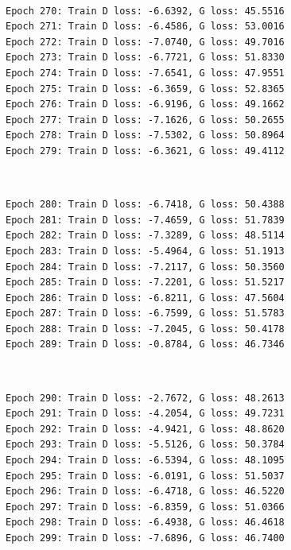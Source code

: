 \documentclass[11pt]{article}
\begin{document}
    \begin{center}
    \end{center}
    { \hspace*{\fill} \\}
    
    \begin{Verbatim}[commandchars=\\\{\}]
Epoch 270: Train D loss: -6.6392, G loss: 45.5516
Epoch 271: Train D loss: -6.4586, G loss: 53.0016
Epoch 272: Train D loss: -7.0740, G loss: 49.7016
Epoch 273: Train D loss: -6.7721, G loss: 51.8330
Epoch 274: Train D loss: -7.6541, G loss: 47.9551
Epoch 275: Train D loss: -6.3659, G loss: 52.8365
Epoch 276: Train D loss: -6.9196, G loss: 49.1662
Epoch 277: Train D loss: -7.1626, G loss: 50.2655
Epoch 278: Train D loss: -7.5302, G loss: 50.8964
Epoch 279: Train D loss: -6.3621, G loss: 49.4112

    \end{Verbatim}

    \begin{center}
    \end{center}
    { \hspace*{\fill} \\}
    
    \begin{Verbatim}[commandchars=\\\{\}]
Epoch 280: Train D loss: -6.7418, G loss: 50.4388
Epoch 281: Train D loss: -7.4659, G loss: 51.7839
Epoch 282: Train D loss: -7.3289, G loss: 48.5114
Epoch 283: Train D loss: -5.4964, G loss: 51.1913
Epoch 284: Train D loss: -7.2117, G loss: 50.3560
Epoch 285: Train D loss: -7.2201, G loss: 51.5217
Epoch 286: Train D loss: -6.8211, G loss: 47.5604
Epoch 287: Train D loss: -6.7599, G loss: 51.5783
Epoch 288: Train D loss: -7.2045, G loss: 50.4178
Epoch 289: Train D loss: -0.8784, G loss: 46.7346

    \end{Verbatim}

    \begin{center}
    \end{center}
    { \hspace*{\fill} \\}
    
    \begin{Verbatim}[commandchars=\\\{\}]
Epoch 290: Train D loss: -2.7672, G loss: 48.2613
Epoch 291: Train D loss: -4.2054, G loss: 49.7231
Epoch 292: Train D loss: -4.9421, G loss: 48.8620
Epoch 293: Train D loss: -5.5126, G loss: 50.3784
Epoch 294: Train D loss: -6.5394, G loss: 48.1095
Epoch 295: Train D loss: -6.0191, G loss: 51.5037
Epoch 296: Train D loss: -6.4718, G loss: 46.5220
Epoch 297: Train D loss: -6.8359, G loss: 51.0366
Epoch 298: Train D loss: -6.4938, G loss: 46.4618
Epoch 299: Train D loss: -7.6896, G loss: 46.7400

    \end{Verbatim}
\end{document}
